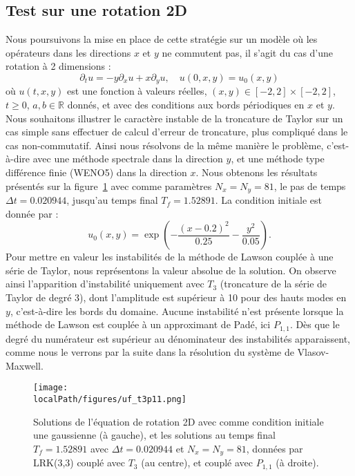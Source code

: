 \subsection{Test sur une rotation 2D}

Nous poursuivons la mise en place de cette stratégie sur un modèle où les opérateurs dans les directions $x$ et $y$ ne commutent pas, il s'agit du cas d'une rotation à 2 dimensions :
$$
  \partial_t u = -y\partial_x u + x\partial_y u,\quad u(0,x,y)=u_0(x,y)
$$
où $u(t,x,y)$ est une fonction à valeurs réelles, $(x,y)\in[-2,2]\times[-2,2]$, $t\geq0$, $a,b\in\mathbb{R}$ donnés, et avec des conditions aux bords périodiques en $x$ et $y$. Nous souhaitons illustrer le caractère instable de la troncature de Taylor sur un cas simple sans effectuer de calcul d'erreur de troncature, plus compliqué dans le cas non-commutatif. Ainsi nous résolvons de la même manière le problème, c'est-à-dire avec une méthode spectrale dans la direction $y$, et une méthode type différence finie (WENO5) dans la direction $x$. Nous obtenons les résultats présentés sur la figure~\ref{fig:uft3p11} avec comme paramètres $N_x=N_y=81$, le pas de temps $\Delta t=0.020944$, jusqu'au temps final $T_f=1.52891$. La condition initiale est donnée par :
$$
  u_0(x,y) = \exp( -\frac{(x-0.2)^2}{0.25} - \frac{y^2}{0.05} ).
$$
Pour mettre en valeur les instabilités de la méthode de Lawson couplée à une série de Taylor, nous représentons la valeur absolue de la solution. On observe ainsi l'apparition d'instabilité uniquement avec $T_3$ (troncature de la série de Taylor de degré 3), dont l'amplitude est supérieur à 10 pour des hauts modes en $y$, c'est-à-dire les bords du domaine. Aucune instabilité n'est présente lorsque la méthode de Lawson est couplée à un approximant de Padé, ici $P_{1,1}$. Dès que le degré du numérateur est supérieur au dénominateur des instabilités apparaissent, comme nous le verrons par la suite dans la résolution du système de Vlasov-Maxwell.

\begin{figure}
  \centering
  \texttt{[image: \\localPath/figures/uf\_t3p11.png]}
    \caption{Solutions de l'équation de rotation 2D avec comme condition initiale une gaussienne (à gauche), et les solutions au temps final $T_f=1.52891$ avec $\Delta t=0.020944$ et $N_x=N_y=81$, données par LRK(3,3) couplé avec $T_3$ (au centre), et couplé avec $P_{1,1}$ (à droite).}
    \label{fig:uft3p11}
\end{figure}

